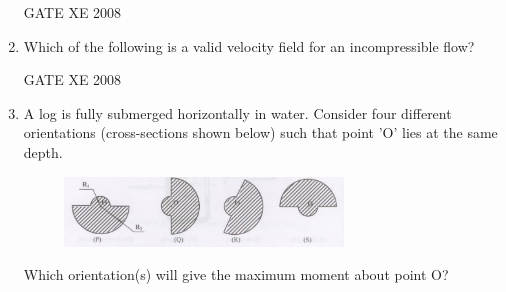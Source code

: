 \documentclass[12pt]{article}
\begin{document}
\begin{enumerate}
\begin{enumerate}
\end{enumerate}

GATE XE 2008
\item Which of the following is a valid velocity field for an incompressible flow?

\begin{enumerate}
\end{enumerate}

GATE XE 2008
\item A log is fully submerged horizontally in water. Consider four different orientations (cross-sections shown below) such that point 'O' lies at the same depth.

\begin{figure}[H]
\centering
  \includegraphics[width=0.7\textwidth]{figs/ass1_d_q24.png}
  \caption{}
\end{figure} 

Which orientation(s) will give the maximum moment about point O?

\begin{enumerate}
\end{enumerate}


\end{enumerate}
\end{document}
